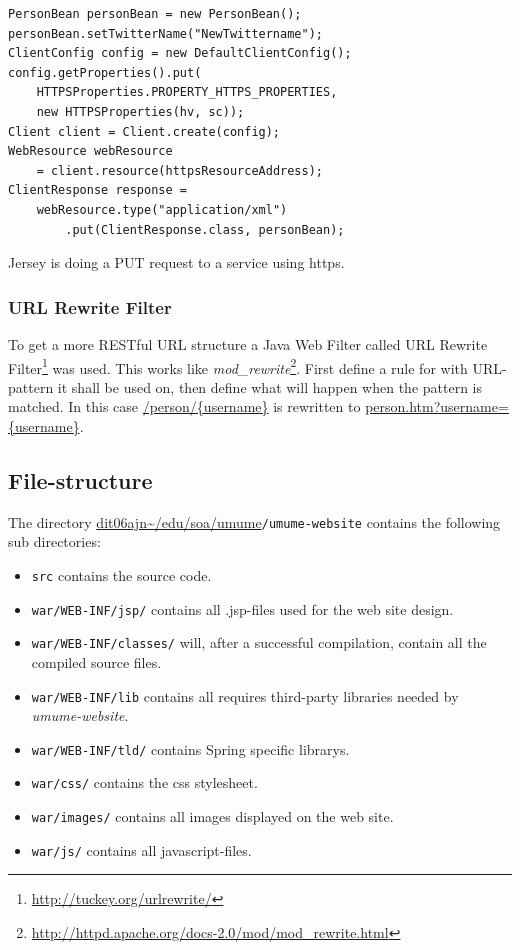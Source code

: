 \documentclass[titlepage, twocolumn, a4paper, 10pt]{article}
\def\pathtocode{\url{dit06ajn~/edu/soa/umume}}
\begin{document}
\begin{code}
  \begin{footnotesize}
\begin{verbatim}
PersonBean personBean = new PersonBean();
personBean.setTwitterName("NewTwittername");
ClientConfig config = new DefaultClientConfig();
config.getProperties().put(
    HTTPSProperties.PROPERTY_HTTPS_PROPERTIES,
    new HTTPSProperties(hv, sc));
Client client = Client.create(config);
WebResource webResource
    = client.resource(httpsResourceAddress);
ClientResponse response =
    webResource.type("application/xml")
        .put(ClientResponse.class, personBean);
\end{verbatim}
  \end{footnotesize}
  \caption{Jersey is doing a PUT request to a service using https.}\label{code:https}
\end{code}

\subsubsection{URL Rewrite Filter}\label{sec:urlfilter}
To get a more RESTful URL structure a Java Web Filter called URL
Rewrite Filter\footnote{\url{http://tuckey.org/urlrewrite/}} was
used. This works like
\textit{mod\_rewrite}\footnote{\url{http://httpd.apache.org/docs-2.0/mod/mod_rewrite.html}}.
First define a rule for with URL-pattern it shall be used on, then
define what will happen when the pattern is matched. In this case
\url{/person/{username}} is rewritten to
\url{person.htm?username={username}}.

\subsection{File-structure}\label{sec:filestructureweb}
The directory \pathtocode\texttt{/umume-website} contains the
following sub directories:
\begin{itemize}
\item \verb!src! contains the source code.
\item \verb!war/WEB-INF/jsp/! contains all .jsp-files used for the web site design.
\item \verb!war/WEB-INF/classes/! will, after a successful compilation,
  contain all the compiled source files.
\item \verb!war/WEB-INF/lib! contains all requires third-party libraries
  needed by \textit{umume-website}.
\item \verb!war/WEB-INF/tld/! contains Spring specific librarys.
\item \verb!war/css/! contains the css stylesheet.
\item \verb!war/images/! contains all images displayed on the web site.
\item \verb!war/js/! contains all javascript-files.
\end{itemize}
\end{document}

